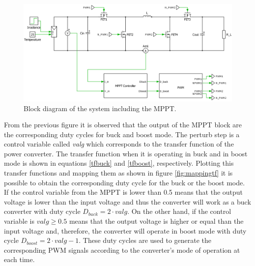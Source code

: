 \begin{figure}[H]
	\begin{center}
		\includegraphics[width=\textwidth]{../Pictures/BD_implementation_POalgorithm}
		\caption{Block diagram of the system including the MPPT.}
		\label{BD_POalgorithm}
	\end{center}	
\end{figure}

From the previous figure it is observed that the output of the MPPT block are the corresponding duty cycles for buck and boost mode. The perturb step is a control variable called \textit{valg} which corresponds to the transfer function of the power converter. 
The transfer function when it is operating in buck and in boost mode is shown in equations \ref{tfbuck} and \ref{tfboost}, respectively. Plotting this transfer functions and mapping them as shown in figure \ref{fig:mappingtf} it is possible to obtain the corresponding duty cycle for the buck or the boost mode. If the control variable from the MPPT is lower than 0.5  means that the output voltage is lower than the input voltage and thus the converter will work as a buck converter with duty cycle $D_{buck}=2\cdot valg$. On the other hand, if the control variable is $valg \geq 0.5$ means that the output voltage is higher or equal than the input voltage and, therefore, the converter will operate in boost mode with duty cycle $D_{boost}=2\cdot valg - 1$. These duty cycles are used to generate the corresponding PWM signals according to the converter's mode of operation at each time. 

